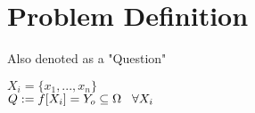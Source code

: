 \documentclass[11pt]{article}
\begin{document}























\newpage
\section{Problem Definition}
Also denoted as a "Question"
\begin{center}
$
X_i = \{x_1,...,x_n\}
$
\\ \vspace{2mm}
$
Q := f \lbrack X_i \rbrack = Y_{o} \subseteq \Omega \hspace{3mm} \forall X_i
$
\end{center}
\end{document}
